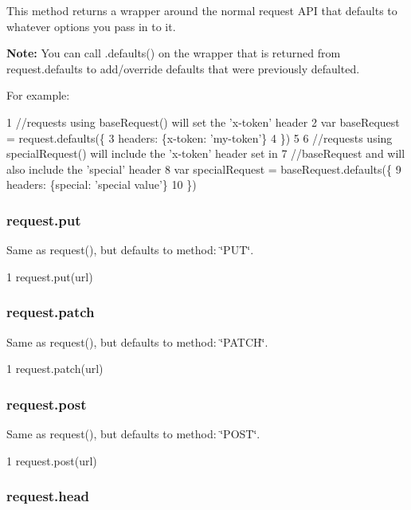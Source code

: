 This method returns a wrapper around the normal request A\+P\+I that defaults to whatever options you pass in to it.

{\bfseries Note\+:} You can call {\ttfamily .defaults()} on the wrapper that is returned from {\ttfamily request.\+defaults} to add/override defaults that were previously defaulted.

For example\+: 
\begin{DoxyCode}
1 //requests using baseRequest() will set the 'x-token' header
2 var baseRequest = request.defaults(\{
3   headers: \{x-token: 'my-token'\}
4 \})
5 
6 //requests using specialRequest() will include the 'x-token' header set in
7 //baseRequest and will also include the 'special' header
8 var specialRequest = baseRequest.defaults(\{
9   headers: \{special: 'special value'\}
10 \})
\end{DoxyCode}


\subsubsection*{request.\+put}

Same as {\ttfamily request()}, but defaults to {\ttfamily method\+: \char`\"{}\+P\+U\+T\char`\"{}}.


\begin{DoxyCode}
1 request.put(url)
\end{DoxyCode}


\subsubsection*{request.\+patch}

Same as {\ttfamily request()}, but defaults to {\ttfamily method\+: \char`\"{}\+P\+A\+T\+C\+H\char`\"{}}.


\begin{DoxyCode}
1 request.patch(url)
\end{DoxyCode}


\subsubsection*{request.\+post}

Same as {\ttfamily request()}, but defaults to {\ttfamily method\+: \char`\"{}\+P\+O\+S\+T\char`\"{}}.


\begin{DoxyCode}
1 request.post(url)
\end{DoxyCode}


\subsubsection*{request.\+head}


